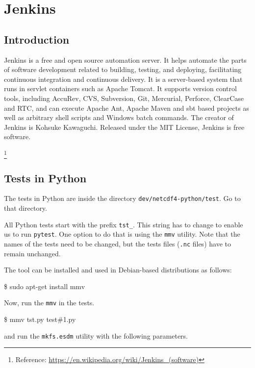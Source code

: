 \chapter{Jenkins}
\label{ch:jenkins}

\section{Introduction}

{\itshape

Jenkins is a free and open source automation server.
It helps automate the parts of software development related to building, testing, and deploying, facilitating continuous integration and continuous delivery.
It is a server-based system that runs in servlet containers such as Apache Tomcat.
It supports version control tools, including AccuRev, CVS, Subversion, Git, Mercurial, Perforce, ClearCase and RTC, and can execute Apache Ant, Apache Maven and sbt based projects as well as arbitrary shell scripts and Windows batch commands.
The creator of Jenkins is Kohsuke Kawaguchi. Released under the MIT License, Jenkins is free software.
}\footnote{Reference: \url{https://en.wikipedia.org/wiki/Jenkins_(software)}}

\section{Tests in Python}

The tests in Python are inside the directory \texttt{dev/netcdf4-python/test}. Go to that directory.

All Python tests start with the prefix \texttt{tst\_}. This string has to change to enable us to run \texttt{pytest}.
One option to do that is using the \texttt{mmv} utility. Note that the names of the tests need to be changed, but the tests files (\texttt{.nc} files) have to remain unchanged.

The tool can be installed and used in Debian-based distributions as follows:

\begin{framed}
\$ sudo apt-get install mmv
\end{framed}

Now, run the \texttt{mmv} in the tests.

\begin{framed}
\$ mmv tst\*.py test\#1.py
\end{framed}

and run the \texttt{mkfs.esdm} utility with the following parameters.

